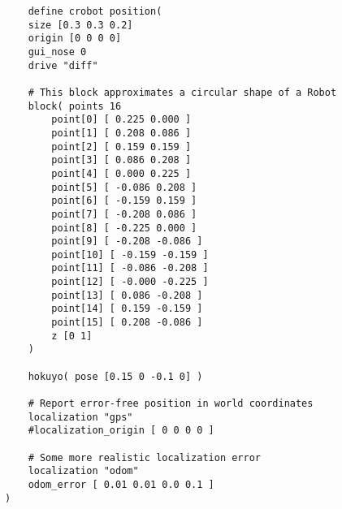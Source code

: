 \begin{lstlisting}
    define crobot position(
    size [0.3 0.3 0.2]
    origin [0 0 0 0]
    gui_nose 0
    drive "diff"

    # This block approximates a circular shape of a Robot
    block( points 16
        point[0] [ 0.225 0.000 ]
        point[1] [ 0.208 0.086 ]
        point[2] [ 0.159 0.159 ]
        point[3] [ 0.086 0.208 ]
        point[4] [ 0.000 0.225 ]
        point[5] [ -0.086 0.208 ]
        point[6] [ -0.159 0.159 ]
        point[7] [ -0.208 0.086 ]
        point[8] [ -0.225 0.000 ]
        point[9] [ -0.208 -0.086 ]
        point[10] [ -0.159 -0.159 ]
        point[11] [ -0.086 -0.208 ]
        point[12] [ -0.000 -0.225 ]
        point[13] [ 0.086 -0.208 ]
        point[14] [ 0.159 -0.159 ]
        point[15] [ 0.208 -0.086 ]
        z [0 1]
    )
    
    hokuyo( pose [0.15 0 -0.1 0] )

    # Report error-free position in world coordinates
    localization "gps"
    #localization_origin [ 0 0 0 0 ]

    # Some more realistic localization error
    localization "odom"
    odom_error [ 0.01 0.01 0.0 0.1 ]
)
\end{lstlisting}


